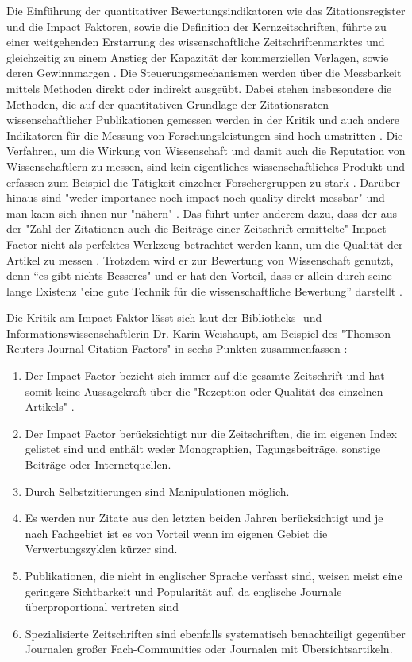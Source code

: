 Die Einführung der quantitativer Bewertungsindikatoren wie das Zitationsregister und die Impact Faktoren, sowie die Definition der Kernzeitschriften, führte zu einer weitgehenden Erstarrung des wissenschaftliche Zeitschriftenmarktes und gleichzeitig zu einem Anstieg der Kapazität der kommerziellen Verlagen, sowie deren Gewinnmargen \cite{CREATe_2014}. Die Steuerungsmechanismen werden über die Messbarkeit mittels Methoden direkt oder indirekt ausgeübt. Dabei stehen insbesondere die Methoden, die auf der quantitativen Grundlage der Zitationsraten wissenschaftlicher Publikationen gemessen werden in der Kritik \cite{Dong_2005} und auch andere Indikatoren für die Messung von Forschungsleistungen sind hoch umstritten \cite{Hornbostel_1997} \cite{Hicks_1996} \cite{Havemann_2002}. Die Verfahren, um die Wirkung von Wissenschaft und damit auch die Reputation von Wissenschaftlern zu messen, sind kein eigentliches wissenschaftliches Produkt \cite{suchen} und erfassen zum Beispiel die Tätigkeit einzelner Forschergruppen zu stark \cite{schmoch_2009}. Darüber hinaus sind "weder importance noch impact noch quality direkt messbar" und man kann sich ihnen nur "nähern" \cite{Hornbostel_1997}. Das führt unter anderem dazu, dass der aus der "Zahl der Zitationen auch die Beiträge einer Zeitschrift ermittelte" \cite{weishaupt_2009_goldenOA} Impact Factor nicht  als perfektes Werkzeug betrachtet werden kann, um die Qualität der Artikel zu messen \cite{garfield_1999}. Trotzdem wird er zur Bewertung von Wissenschaft genutzt, denn “es gibt nichts Besseres" und er hat den Vorteil, dass er allein durch seine lange Existenz "eine gute Technik für die wissenschaftliche Bewertung” darstellt \cite{garfield_1999} \cite{weishaupt_2009_goldenOA}.

Die Kritik am Impact Faktor lässt sich laut der Bibliotheks- und Informationswissenschaftlerin Dr. Karin Weishaupt, am Beispiel des "Thomson Reuters Journal Citation Factors" in sechs Punkten zusammenfassen \cite{weishaupt_2009_goldenOA}:
\begin{enumerate}
\item Der Impact Factor bezieht sich immer auf die gesamte Zeitschrift und hat somit keine Aussagekraft über die "Rezeption oder Qualität des einzelnen Artikels" \cite{weishaupt_2009_goldenOA}.
\item Der Impact Factor berücksichtigt nur die Zeitschriften, die im eigenen Index gelistet sind und enthält weder Monographien, Tagungsbeiträge, sonstige Beiträge oder Internetquellen.
\item Durch Selbstzitierungen sind Manipulationen möglich.
\item Es werden nur Zitate aus den letzten beiden Jahren berücksichtigt und je nach Fachgebiet ist es von Vorteil wenn im eigenen Gebiet die Verwertungszyklen kürzer sind.
\item Publikationen, die nicht in englischer Sprache verfasst sind, weisen meist eine geringere Sichtbarkeit und Popularität auf, da englische Journale überproportional vertreten sind
\item Spezialisierte Zeitschriften sind ebenfalls systematisch benachteiligt gegenüber Journalen großer Fach-Communities oder Journalen mit Übersichtsartikeln.
\end{enumerate}


